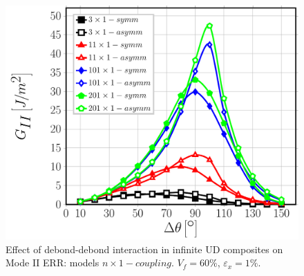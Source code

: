 \documentclass[smallextended]{svjour3}       %
\begin{document}
\begin{figure}[!h]
\centering
\includegraphics[width=\textwidth]{nx1-coupling-vf60-GII.pdf}
\caption{Effect of debond-debond interaction in infinite UD composites on Mode II ERR: models $n\times 1-coupling$. $V_{f}=60\%$, $\varepsilon_{x}=1\%$.}\label{fig:verticalGII}
\end{figure}
\end{document}
